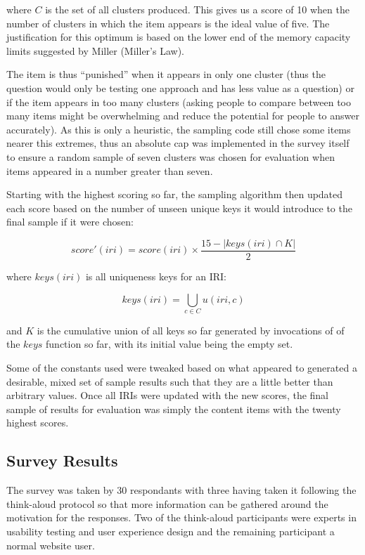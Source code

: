 \noindent where $C$ is the set of all clusters produced. This gives
us a score of 10 when the number of clusters in which the item appears
is the ideal value of five. The justification for this optimum is
based on the lower end of the memory capacity limits suggested by
Miller\cite{miller1956magical} (Miller's Law).

The item is thus ``punished'' when it appears in only one cluster
(thus the question would only be testing one approach and has less
value as a question) or if the item appears in too many clusters
(asking people to compare between too many items might be
overwhelming and reduce the potential for people to answer
accurately). As this is only a heuristic, the sampling code still
chose some items nearer this extremes, thus an absolute cap was
implemented in the survey itself to ensure a random sample of seven
clusters was chosen for evaluation when items appeared in a number
greater than seven.

Starting with the highest scoring so far, the sampling algorithm
then updated each score based on the number of unseen unique keys
it would introduce to the final sample if it were chosen:

$$
score'(iri) = score(iri) \times \frac{15 - |keys(iri) \cap K|}{2}
$$

\noindent where $keys(iri)$ is all uniqueness keys for an IRI:

$$
keys(iri) = \bigcup_{c \in C} u(iri, c)
$$

\noindent and $K$ is the cumulative union of all keys so far
generated by invocations of of the $keys$ function so far, with its
initial value being the empty set.

Some of the constants used were tweaked based on what appeared to
generated a desirable, mixed set of sample results such that they are
a little better than arbitrary values. Once all IRIs were updated with
the new scores, the final sample of
results for evaluation was simply the content items with the twenty
highest scores.

\subsection{Survey Results}

The survey was taken by 30 respondants with three having taken it
following the think-aloud protocol\cite{lewis1982using} so that more
information can be gathered around the motivation for the responses.
Two of the think-aloud participants were experts in usability testing
and user experience design and the remaining participant a normal
website user.

